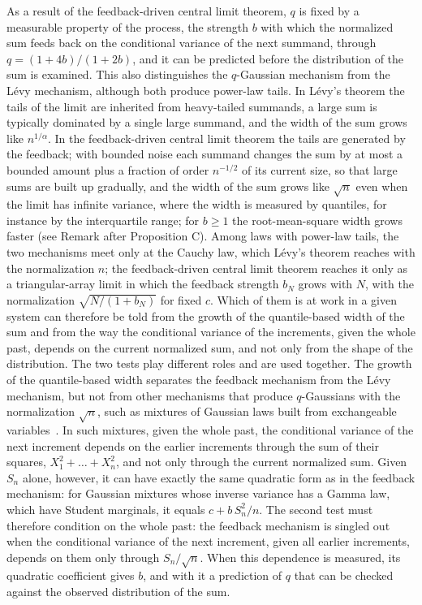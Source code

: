 \documentclass[aip,jmp,preprint,onecolumn,floatfix,superscriptaddress,nofootinbib,11pt]{revtex4-2}
\theoremstyle{plain}
\theoremstyle{remark}
\numberwithin{equation}{section}
\begin{document}
As a result of the feedback-driven central limit theorem, $q$ is fixed by a measurable property of the process, the strength $b$ with which the normalized sum feeds back on the conditional variance of the next summand, through $q=(1+4b)/(1+2b)$, and it can be predicted before the distribution of the sum is examined. This also distinguishes the $q$-Gaussian mechanism from the L\'evy mechanism, although both produce power-law tails. In L\'evy's theorem the tails of the limit are inherited from heavy-tailed summands, a large sum is typically dominated by a single large summand, and the width of the sum grows like $n^{1/\alpha}$. In the feedback-driven central limit theorem the tails are generated by the feedback; with bounded noise each summand changes the sum by at most a bounded amount plus a fraction of order $n^{-1/2}$ of its current size, so that large sums are built up gradually, and the width of the sum grows like $\sqrt n$ even when the limit has infinite variance, where the width is measured by quantiles, for instance by the interquartile range; for $b\ge1$ the root-mean-square width grows faster (see Remark after Proposition C). Among laws with power-law tails, the two mechanisms meet only at the Cauchy law, which L\'evy's theorem reaches with the normalization $n$; the feedback-driven central limit theorem reaches it only as a triangular-array limit in which the feedback strength $b_N$ grows with $N$, with the normalization $\sqrt{N/(1+b_N)}$ for fixed $c$. Which of them is at work in a given system can therefore be told from the growth of the quantile-based width of the sum and from the way the conditional variance of the increments, given the whole past, depends on the current normalized sum, and not only from the shape of the distribution. The two tests play different roles and are used together. The growth of the quantile-based width separates the feedback mechanism from the L\'evy mechanism, but not from other mechanisms that produce $q$-Gaussians with the normalization $\sqrt n$, such as mixtures of Gaussian laws built from exchangeable variables~\cite{HJU2010}. In such mixtures, given the whole past, the conditional variance of the next increment depends on the earlier increments through the sum of their squares, $X_1^{2}+\dots+X_n^{2}$, and not only through the current normalized sum. Given $S_n$ alone, however, it can have exactly the same quadratic form as in the feedback mechanism: for Gaussian mixtures whose inverse variance has a Gamma law, which have Student marginals, it equals $c+b\,S_n^{2}/n$. The second test must therefore condition on the whole past: the feedback mechanism is singled out when the conditional variance of the next increment, given all earlier increments, depends on them only through $S_n/\sqrt n$. When this dependence is measured, its quadratic coefficient gives $b$, and with it a prediction of $q$ that can be checked against the observed distribution of the sum.
\end{document}
